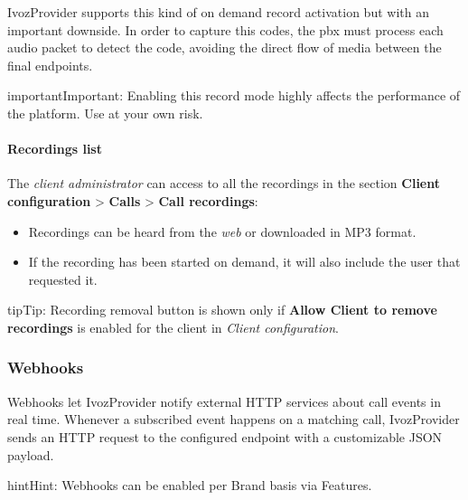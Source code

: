 \documentclass[letterpaper,10pt,english]{sphinxmanual}
\begin{document}
IvozProvider supports this kind of on demand record activation but with an
important downside. In order to capture this codes, the pbx must process each
audio packet to detect the code, avoiding the direct flow of media between the
final endpoints.

\begin{notice}{important}{Important:}
Enabling this record mode highly affects the performance of the
platform. Use at your own risk.
\end{notice}


\paragraph{Recordings list}
\label{administration_portal/client/vpbx/calls/call_recordings:recordings-list}
The \emph{client administrator} can access to all the recordings in the section
\textbf{Client configuration} \textgreater{} \textbf{Calls} \textgreater{} \textbf{Call recordings}:
\begin{itemize}
\item {} 
Recordings can be heard from the \emph{web} or downloaded in MP3 format.

\item {} 
If the recording has been started on demand, it will also include the user
that requested it.

\end{itemize}

\begin{notice}{tip}{Tip:}
Recording removal button is shown only if \textbf{Allow Client to remove recordings} is enabled
for the client in \emph{Client configuration}.
\end{notice}


\subsubsection{Webhooks}
\label{administration_portal/client/vpbx/calls/webhooks:vpbx-webhooks}\label{administration_portal/client/vpbx/calls/webhooks::doc}\label{administration_portal/client/vpbx/calls/webhooks:webhooks}
Webhooks let IvozProvider notify external HTTP services about call events in real time. Whenever a
subscribed event happens on a matching call, IvozProvider sends an HTTP  request to the
configured endpoint with a customizable JSON payload.

\begin{notice}{hint}{Hint:}
Webhooks can be enabled per Brand basis via Features.
\end{notice}
\end{document}
